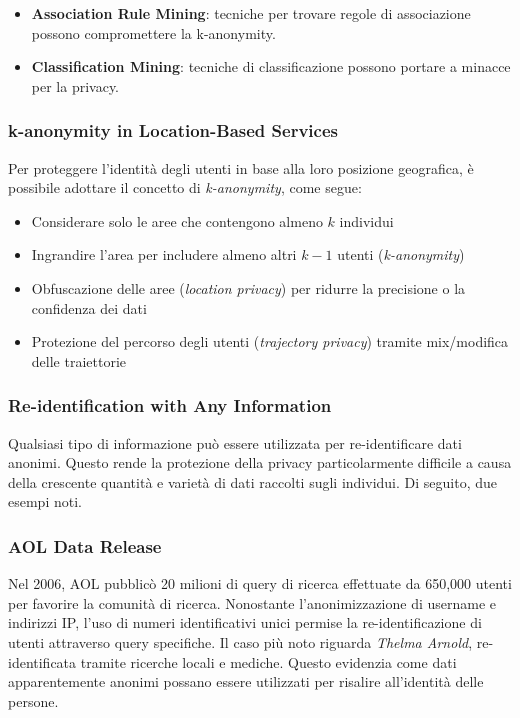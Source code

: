 \documentclass{report}
\begin{document}
\begin{itemize}
    \item \textbf{Association Rule Mining}: tecniche per trovare regole di associazione possono compromettere la k-anonymity.
    \item \textbf{Classification Mining}: tecniche di classificazione possono portare a minacce per la privacy.
\end{itemize}

\subsubsection{ k-anonymity in Location-Based Services}
Per proteggere l'identità degli utenti in base alla loro posizione geografica, è possibile adottare il concetto di \textit{k-anonymity}, come segue:

\begin{itemize}
    \item Considerare solo le aree che contengono almeno $k$ individui
    \item Ingrandire l'area per includere almeno altri $k-1$ utenti (\textit{k-anonymity})
    \item Obfuscazione delle aree (\textit{location privacy}) per ridurre la precisione o la confidenza dei dati
    \item Protezione del percorso degli utenti (\textit{trajectory privacy}) tramite mix/modifica delle traiettorie
\end{itemize}

\subsubsection{ Re-identification with Any Information}
Qualsiasi tipo di informazione può essere utilizzata per re-identificare dati anonimi. Questo rende la protezione della privacy particolarmente difficile a causa della crescente quantità e varietà di dati raccolti sugli individui. Di seguito, due esempi noti.

\subsubsection{ AOL Data Release}
Nel 2006, AOL pubblicò 20 milioni di query di ricerca effettuate da 650,000 utenti per favorire la comunità di ricerca. Nonostante l'anonimizzazione di username e indirizzi IP, l'uso di numeri identificativi unici permise la re-identificazione di utenti attraverso query specifiche. 
Il caso più noto riguarda \textit{Thelma Arnold}, re-identificata tramite ricerche locali e mediche. Questo evidenzia come dati apparentemente anonimi possano essere utilizzati per risalire all'identità delle persone.
\end{document}
